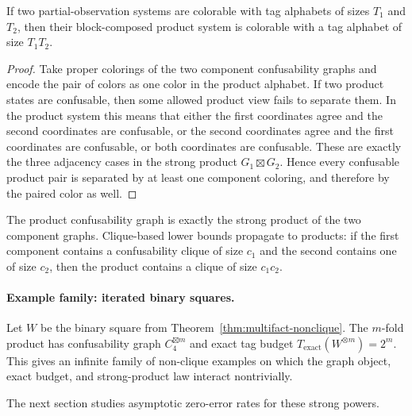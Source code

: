 \begin{theorem}\label{thm:multifact-product}
If two partial-observation systems are colorable with tag alphabets of sizes $T_1$ and $T_2$, then their block-composed product system is colorable with a tag alphabet of size $T_1T_2$.
\end{theorem}

\begin{proof}
Take proper colorings of the two component confusability graphs and encode the pair of colors as one color in the product alphabet. If two product states are confusable, then some allowed product view fails to separate them. In the product system this means that either the first coordinates agree and the second coordinates are confusable, or the second coordinates agree and the first coordinates are confusable, or both coordinates are confusable. These are exactly the three adjacency cases in the strong product $G_1\boxtimes G_2$. Hence every confusable product pair is separated by at least one component coloring, and therefore by the paired color as well.
\end{proof}

The product confusability graph is exactly the strong product of the two component graphs. Clique-based lower bounds propagate to products: if the first component contains a confusability clique of size $c_1$ and the second contains one of size $c_2$, then the product contains a clique of size $c_1c_2$.

\paragraph{Example family: iterated binary squares.}
Let $W$ be the binary square from Theorem~\ref{thm:multifact-nonclique}. The $m$-fold product has confusability graph $C_4^{\boxtimes m}$ and exact tag budget $T_{\mathrm{exact}}(W^{\otimes m}) = 2^m$. This gives an infinite family of non-clique examples on which the graph object, exact budget, and strong-product law interact nontrivially.

The next section studies asymptotic zero-error rates for these strong powers.
